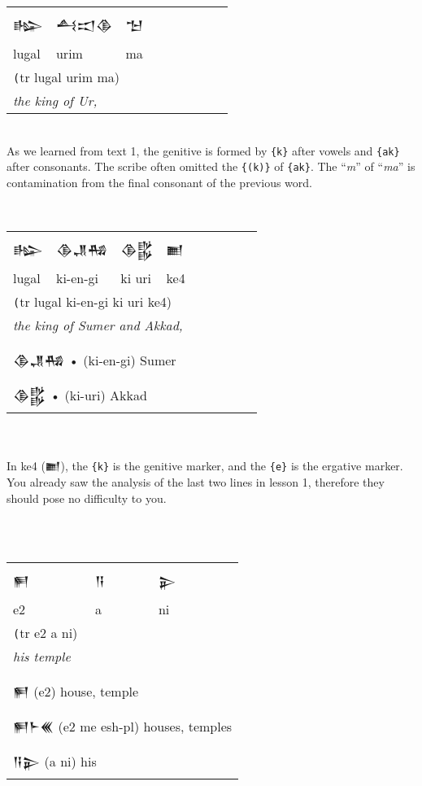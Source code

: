 \documentclass[a4paper,12pt]{book}
\newcommand{\fcn}{\setmainfont{Akkadian.otf}}
\newcommand{\fcm}{\large\setmainfont{Akkadian.otf}}
\begin{document}
 \newpage
 \noindent    
 \begin{tabular}[!h]{l l l l l l l l l}
   \fcm 𒈗 &\fcm 𒋀𒀊𒆠
   &\fcm 𒈠\\
   lugal & urim & ma\\
   \multicolumn{3}{l}{\texttt (tr lugal urim ma)}\\
   \multicolumn{3}{l}{\em the king of Ur,}\\
 \end{tabular}\verb||\\

 As we learned from text 1, the genitive is
 formed by \verb|{k}| after vowels
 and \verb|{ak}| after consonants.
 The scribe often omitted the \verb|{(k)}|
 of \verb|{ak}|. The ``{\em m}'' of
 ``{\em ma}'' is contamination from the final
 consonant of the previous word.

\verb||\\
 \begin{tabular}[!h]{l l l l l l l l l}
   \fcm 𒈗 &\fcm 𒆠𒂗𒄀
   &\fcm 𒆠𒌵 &\fcm 𒆤 \\
   lugal & ki-en-gi & ki uri & ke4\\
   \multicolumn{4}{l}{\texttt (tr lugal ki-en-gi ki uri ke4)}\\
   \multicolumn{4}{l}{\em the king of Sumer and Akkad,}\\
   \hline\\
     \multicolumn{4}{l}{{\fcn 𒆠𒂗𒄀} • (ki-en-gi) Sumer }\\
  \multicolumn{4}{l}{{\fcn 𒆠𒌵} • (ki-uri) Akkad }\\
 \end{tabular}\verb||\\
 
 
 \verb||\\
 In ke4 ({\fcn 𒆤}), the \verb|{k}| is the
 genitive marker, and the \verb|{e}| is the ergative marker.
 You already saw the analysis of the last two
 lines in lesson 1, therefore they should pose
 no difficulty to you.
 
 \verb||\\
 \verb||\\
\begin{tabular}[!h]{l l l}
\fcm 𒂍
&\fcm 𒀀 &\fcm 𒉌\\
  e2 & a & ni\\
\multicolumn{3}{l}{\texttt (tr e2 a ni)}\\
\multicolumn{3}{l}{\em his temple}\\
\hline\\
\multicolumn{3}{l}{{\fcn 𒂍}
  (e2)  house, temple}\\
\multicolumn{3}{l}{{\fcn 𒂍𒈨𒌍}
                    (e2 me esh-pl) houses, temples }\\
\multicolumn{3}{l}{{\fcn 𒀀𒉌}
                    (a ni) his }\\
\end{tabular}
\end{document}
